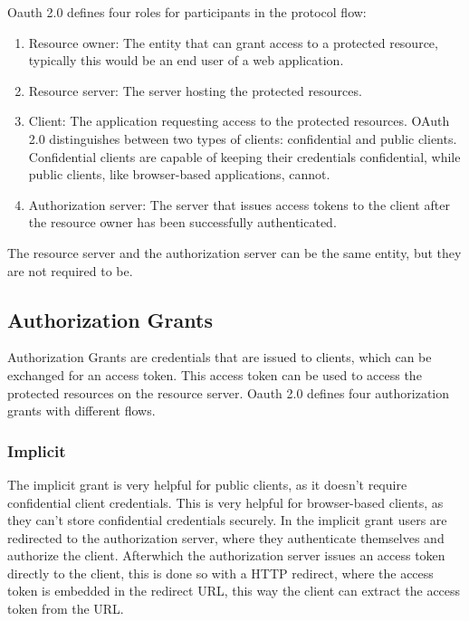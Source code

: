 Oauth 2.0 defines four roles for participants in the protocol flow:

\begin{enumerate}
	\item Resource owner: The entity that can grant access to a protected resource, typically this would be an end user of a web application.
	\item Resource server: The server hosting the protected resources.
	\item Client: The application requesting access to the protected resources.
	      OAuth 2.0 distinguishes between two types of clients: confidential and public clients.
	      Confidential clients are capable of keeping their credentials confidential, while public clients, like browser-based applications, cannot.
	\item Authorization server: The server that issues access tokens to the client after the resource owner has been successfully authenticated.
\end{enumerate}

The resource server and the authorization server can be the same entity, but they are not required to be.

\subsection{Authorization Grants}


Authorization Grants are credentials that are issued to clients, which can be exchanged for an access token.
This access token can be used to access the protected resources on the resource server.
Oauth 2.0 defines four authorization grants with different flows.


\subsubsection{Implicit}
\label{cha:relatedwork:oauth:implicit}

The implicit grant is very helpful for public clients, as it doesn't require confidential client credentials.
This is very helpful for browser-based clients, as they can't store confidential credentials securely.
In the implicit grant users are redirected to the authorization server, where they
authenticate themselves and authorize the client.
Afterwhich the authorization server issues an access token directly to the client,
this is done so with a HTTP redirect, where the access token is embedded in the redirect URL,
this way the client can extract the access token from the URL.

